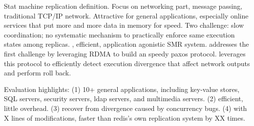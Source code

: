 Stat machine replication definition. Focus on networking part, message passing, 
traditional TCP/IP network. Attractive for general applications, especially 
online services that put more and more data in memory for speed. Two challenge: 
slow coordination; no systematic mechanism to practically enforce same 
execution states among replicas. \xxx, efficient, application agonistic SMR 
system. \xxx addresses the first challenge by leveraging RDMA to build an 
speedy paxos protocol. \xxx leverages this protocol to efficiently detect 
execution divergence that affect network outputs and perform roll back. 

Evaluation highlights: (1) 10+ general applications, including key-value 
stores, SQL servers, security servers, ldap servers, and multimedia servers. 
(2) efficient, little overhead. (3) recover from divergence caused by 
concurrency bugs. (4) with X lines of modifications, faster than redis's own 
replication system by XX times. 
